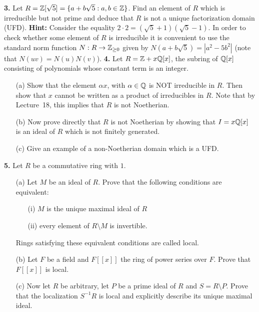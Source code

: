 \documentclass[12pt]{amsart}
\begin{document}
\skv

{\bf 3.} Let $R={\mathbb Z}[\sqrt{5}]=\{a+b\sqrt{5} : a,b\in{\mathbb Z}\}$. Find an element of $R$
which is irreducible but not prime and deduce that $R$ is not a unique factorization domain (UFD).
\skv
 {\bf Hint:} Consider the equality $2\cdot 2=(\sqrt{5}+1)(\sqrt{5}-1)$. In order to check
whether some element of $R$ is irreducible it is convenient to use the standard norm function
$N:R\to{\mathbb Z}_{\geq 0}$ given by $N(a+b\sqrt{5})=|a^2-5b^2|$ (note that $N(uv)=N(u)N(v)$).
\skv\skv 
{\bf 4.} Let $R={\mathbb Z}+x{\mathbb Q}[x]$, the subring of ${\mathbb Q}[x]$ consisting of
polynomials whose constant term is an integer.
\begin{itemize}
\item[(a)] Show that the element $\alpha x$, with $\alpha\in{\mathbb Q}$ is NOT irreducible
in $R$. Then show that $x$ cannot be written as a product of irreducibles in $R$.
Note that by Lecture~18, this implies that $R$ is not Noetherian.

\item[(b)] Now prove directly that $R$ is not Noetherian by showing that
$I=x{\mathbb Q}[x]$ is an ideal of $R$ which is not finitely generated.

\item[(c)] Give an example of a non-Noetherian domain which is a UFD.
\end{itemize}
\skv
{\bf 5.} Let $R$ be a commutative ring with $1$. 
\begin{itemize}
\item[(a)]   Let $M$ be an ideal of $R$. Prove that the following conditions are equivalent:
\begin{itemize}
\item[(i)] $M$ is the unique maximal ideal of $R$ 
\item[(ii)] every element of $R\setminus M$ is invertible. 
\end{itemize}
Rings satisfying these equivalent conditions are called local.
\item[(b)] Let $F$ be a field and $F[[x]]$ the ring of power series over $F$. Prove that $F[[x]]$ is local.
\item[(c)] Now let $R$ be arbitrary, let $P$ be a prime ideal of $R$ and $S=R\setminus P$. Prove that the localization
$S^{-1}R$ is local and explicitly describe its unique maximal ideal.
\end{itemize}
\end{document}
